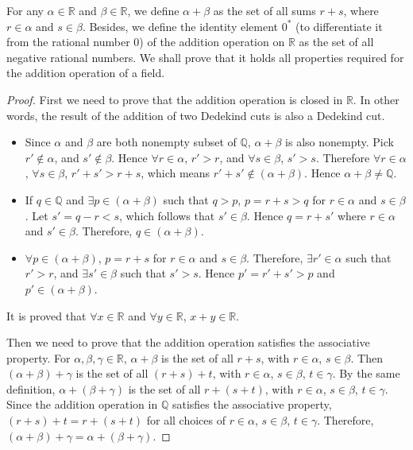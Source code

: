 \documentclass[onecolumn]{article}
\begin{document}
For any $\alpha \in \mathbb{R}$ and $\beta \in \mathbb{R}$, we define 
$\alpha + \beta$ as the set of all sums $r + s$, where $r \in \alpha$ and 
$s \in \beta$. Besides, we define the identity element $0^*$ (to differentiate 
it from the rational number 0) of the addition operation on $\mathbb{R}$ as the 
set of all negative rational numbers. We shall prove that it holds all 
properties required for the addition operation of a field.
\begin{proof}
  First we need to prove that the addition operation is closed in $\mathbb{R}$. 
  In other words, the result of the addition of two Dedekind cuts is also a 
  Dedekind cut.
  \begin{itemize}
    \item Since $\alpha$ and $\beta$ are both nonempty subset of $\mathbb{Q}$, 
    $\alpha + \beta$ is also nonempty. Pick $r' \notin \alpha$, and 
    $s' \notin \beta$. Hence $\forall r \in \alpha$, $r' > r$, and 
    $\forall s \in \beta$, $s' > s$. Therefore $\forall r \in \alpha$, 
    $\forall s \in \beta$, $r' + s' > r + s$, which means 
    $r' + s' \notin (\alpha + \beta)$. Hence $\alpha + \beta \neq \mathbb{Q}$.
    \item If $q \in \mathbb{Q}$ and $\exists p \in (\alpha + \beta)$ such that 
    $q > p$, $p = r + s > q$ for $r \in \alpha$ and $s \in \beta$. Let 
    $s' = q - r < s$, which follows that $s' \in \beta$. Hence $q = r + s'$ 
    where $r \in \alpha$ and $s' \in \beta$. Therefore, $q \in (\alpha + \beta)$.
    \item $\forall p \in (\alpha + \beta)$, $p = r + s$ for $r \in \alpha$ and 
    $s \in \beta$. Therefore, $\exists r' \in \alpha$ such that $r' > r$, and 
    $\exists s' \in \beta$ such that $s' > s$. Hence $p' = r' + s' > p$ and 
    $p' \in (\alpha + \beta)$.
  \end{itemize}
  It is proved that $\forall x \in \mathbb{R}$ and $\forall y \in \mathbb{R}$, 
  $x + y \in \mathbb{R}$.

  Then we need to prove that the addition operation satisfies the associative 
  property. For $\alpha, \beta, \gamma \in \mathbb{R}$, $\alpha + \beta$ is the 
  set of all $r + s$, with $r \in \alpha$, $s \in \beta$. Then 
  $(\alpha + \beta) + \gamma$ is the set of all $(r + s) + t$, with 
  $r \in \alpha$, $s \in \beta$, $t \in \gamma$. By the same definition, 
  $\alpha + (\beta + \gamma)$ is the set of all $r + (s + t)$, with 
  $r \in \alpha$, $s \in \beta$, $t \in \gamma$. Since the addition operation in 
  $\mathbb{Q}$ satisfies the associative property, $(r + s) + t = r + (s + t)$ 
  for all choices of $r \in \alpha$, $s \in \beta$, $t \in \gamma$. Therefore, 
  $(\alpha + \beta) + \gamma = \alpha + (\beta + \gamma)$.


\end{proof}
\end{document}
